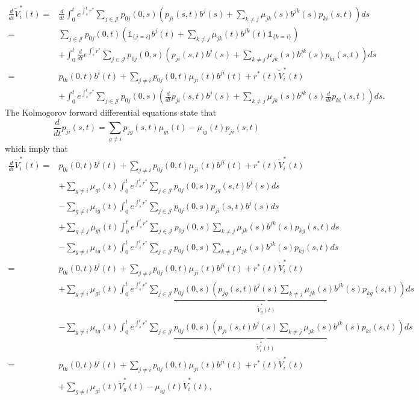 \documentclass[12pt]{article}
\newcommand{\indic}[1]{\mathds{1}_{ \{ #1 \} }}
\theoremstyle{my_thm}
\begin{document}
\begin{align*}
\frac{d}{dt} \tilde{V}_i^*(t)=& \frac{d}{dt} 
\int_0^t e^{\int_s^t r^*} \sum_{j \in \mathcal{J}} p_{0j}(0,s) \left(p_{ji}(s,t)   b^{j}(s) + \sum_{k \neq j}  \mu_{jk}(s) b^{jk}(s) p_{ki}(s,t) \right) ds
\\
=&
\sum_{j \in \mathcal{J}} p_{0j}(0,t) \left( \indic{j=i}   b^{j}(t) + \sum_{k \neq j}  \mu_{jk}(t) b^{jk}(t) \indic{k=i}  \right) 
\\
&+
\int_0^t \frac{d}{dt} e^{\int_s^t r^*} \sum_{j \in \mathcal{J}} p_{0j}(0,s) \left(p_{ji}(s,t)   b^{j}(s) + \sum_{k \neq j}  \mu_{jk}(s) b^{jk}(s) p_{ki}(s,t) \right) ds
\\
=&
p_{0i}(0,t) b^{i}(t) + \sum_{j \neq i} p_{0j}(0,t) \mu_{ji}(t) b^{ji}(t) 
+
r^*(t)\tilde{V}_i^*(t)
\\
&+
\int_0^t e^{\int_s^t r^*} \sum_{j \in \mathcal{J}} p_{0j}(0,s) \left( \frac{d}{dt}p_{ji}(s,t)   b^{j}(s) + \sum_{k \neq j}  \mu_{jk}(s) b^{jk}(s) \frac{d}{dt} p_{ki}(s,t) \right) ds.
\end{align*}
The Kolmogorov forward differential equations state that
$$
\frac{d}{dt}p_{ji}(s,t)=\sum_{g \neq i} p_{jg}(s,t)\mu_{gi}(t) - \mu_{ig}(t)p_{ji}(s,t)
$$
which imply that
\begin{align*}
\frac{d}{dt}\tilde{V}_i^*(t)=&
p_{0i}(0,t) b^{i}(t) + \sum_{j \neq i} p_{0j}(0,t) \mu_{ji}(t) b^{ji}(t) 
+
r^*(t)\tilde{V}_i^*(t)
\\
&+
\sum_{g \neq i} \mu_{gi}(t) \int_0^t e^{\int_s^t r^*} \sum_{j \in \mathcal{J}} p_{0j}(0,s) p_{jg}(s,t)   b^{j}(s) ds
\\
&-
\sum_{g \neq i} \mu_{ig}(t) \int_0^t e^{\int_s^t r^*} \sum_{j \in \mathcal{J}} p_{0j}(0,s)  p_{ji}(s,t)   b^{j}(s)  ds
\\
&+
\sum_{g \neq j} \mu_{gi}(t) \int_0^t e^{\int_s^t r^*} \sum_{j \in \mathcal{J}} p_{0j}(0,s) \sum_{k \neq j}  \mu_{jk}(s) b^{jk}(s) p_{kg}(s,t) ds
\\
&-
\sum_{g \neq i} \mu_{ig}(t) \int_0^t e^{\int_s^t r^*} \sum_{j \in \mathcal{J}} p_{0j}(0,s) \sum_{k \neq j}  \mu_{jk}(s) b^{jk}(s)  p_{kj}(s,t) ds
\\
=&
p_{0i}(0,t) b^{i}(t) + \sum_{j \neq i} p_{0j}(0,t) \mu_{ji}(t) b^{ji}(t) 
+
r^*(t)\tilde{V}_i^*(t)
\\
&+
\sum_{g \neq i} \mu_{gi}(t) \underbrace{ \int_0^t e^{\int_s^t r^*} \sum_{j \in \mathcal{J}} p_{0j}(0,s) \left( p_{jg}(s,t)   b^{j}(s) \sum_{k \neq j}  \mu_{jk}(s) b^{jk}(s) p_{kg}(s,t)\right)  ds}_{\tilde{V}_g^*(t)}
\\
&-
\sum_{g \neq i} \mu_{ig}(t) \underbrace{\int_0^t e^{\int_s^t r^*} \sum_{j \in \mathcal{J}} p_{0j}(0,s) \left( p_{ji}(s,t)   b^{j}(s) \sum_{k \neq j}  \mu_{jk}(s) b^{jk}(s)  p_{ki}(s,t)\right) ds}_{\tilde{V}_i^*(t)}
\\
=&
p_{0i}(0,t) b^{i}(t) + \sum_{j \neq i} p_{0j}(0,t) \mu_{ji}(t) b^{ji}(t) 
+
r^*(t)\tilde{V}_i^*(t)
\\
&+
\sum_{g \neq i} \mu_{gi}(t) \tilde{V}_g^*(t)-\mu_{ig}(t) \tilde{V}_i^*(t),
\end{align*}
\end{document}
